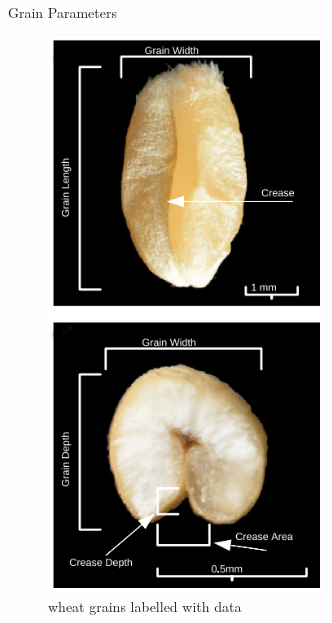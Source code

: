 \documentclass[final]{beamer}
\begin{document}
\begin{frame}{}
\begin{textblock}{28}
\begin{block}{Grain Parameters}
      \begin{multicols}{2}
        \begin{figure}[htb]
          \centering
          \includegraphics[width=7.3cm]{collection2.png}
          \caption{\label{fig:real} wheat grains labelled with data}
        \end{figure}

        \columnbreak


\end{multicols}
\end{block}
\end{textblock}
\end{frame}
\end{document}
